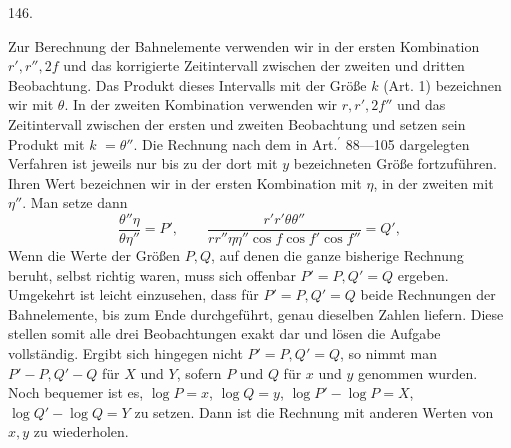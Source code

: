 \par{}\medskip
\begin{center}\hypertarget{native-196-article146}{}146.\end{center}
Zur Berechnung der Bahnelemente verwenden wir in der ersten Kombination $r',r'',2f$ und das korrigierte Zeitintervall zwischen der zweiten und dritten Beobachtung. Das Produkt dieses Intervalls mit der Größe $k$ (Art. 1) bezeichnen wir mit $\theta$. In der zweiten Kombination verwenden wir $r,r',2f''$ und das Zeitintervall zwischen der ersten und zweiten Beobachtung und setzen sein Produkt mit $k$ $=\theta''$. Die Rechnung nach dem in Art.$^{\prime}$ 88—105 dargelegten Verfahren ist jeweils nur bis zu der dort mit $y$ bezeichneten Größe fortzuführen. Ihren Wert bezeichnen wir in der ersten Kombination mit $\eta$, in der zweiten mit $\eta''$. Man setze dann
\[
\frac{\theta''\eta}{\theta\eta''}=P',\qquad
\frac{r'r'\theta\theta''}{rr''\eta\eta''\cos f\cos f'\cos f''}=Q',
\]
Wenn die Werte der Größen $P,Q$, auf denen die ganze bisherige Rechnung beruht, selbst richtig waren, muss sich offenbar $P'=P,Q'=Q$ ergeben. Umgekehrt ist leicht einzusehen, dass für $P'=P,Q'=Q$ beide Rechnungen der Bahnelemente, bis zum Ende durchgeführt, genau dieselben Zahlen liefern. Diese stellen somit alle drei Beobachtungen exakt dar und lösen die Aufgabe vollständig. Ergibt sich hingegen nicht $P'=P,Q'=Q$, so nimmt man $P'-P,Q'-Q$ für $X$ und $Y$, sofern $P$ und $Q$ für $x$ und $y$ genommen wurden. Noch bequemer ist es, $\log P=x$, $\log Q=y$, $\log P'-\log P=X$, $\log Q'-\log Q=Y$ zu setzen.
Dann ist die Rechnung mit anderen Werten von $x,y$ zu wiederholen.
